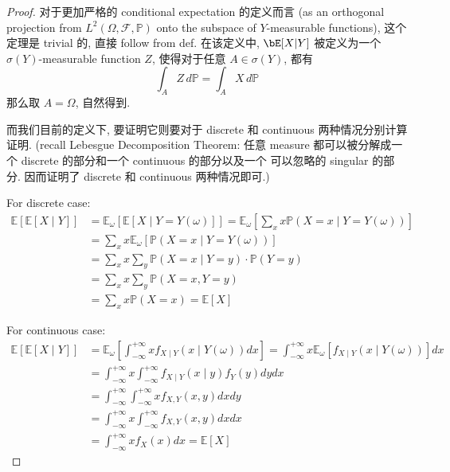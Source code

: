 \begin{proof}
对于更加严格的 conditional expectation 的定义而言
 (as an orthogonal projection from \(L^2(\Omega, \mathcal{F}, \mathbb{P})\) 
 onto the subspace of \(Y\)-measurable functions), 这个定理是 trivial 的, 直接 follow from def. 
在该定义中, \(\bE[X|Y]\) 被定义为一个 \(\sigma(Y)\)-measurable function \(Z\), 
使得对于任意 \(A \in \sigma(Y)\), 都有 \[
\int_A Z \, d\mathbb{P} = \int_A X \, d\mathbb{P}
\]
那么取 \(A = \Omega\), 自然得到.

而我们目前的定义下, 要证明它则要对于 discrete 和 continuous 两种情况分别计算证明.
(recall Lebesgue Decomposition Theorem: 
任意 measure 都可以被分解成一个 discrete 的部分和一个 continuous 的部分以及一个
可以忽略的 singular 的部分. 因而证明了 discrete 和 continuous 两种情况即可.)

For discrete case:
\begin{align*}
\mathbb{E}[\mathbb{E}[X \mid Y]] & =\mathbb{E}_\omega[\mathbb{E}[X \mid Y=Y(\omega)]]=\mathbb{E}_\omega\left[\sum_x x \mathbb{P}(X=x \mid Y=Y(\omega))\right] \\
& =\sum_x x \mathbb{E}_\omega[\mathbb{P}(X=x \mid Y=Y(\omega))] \\
& =\sum_x x \sum_y \mathbb{P}(X=x \mid Y=y) \cdot \mathbb{P}(Y=y) \\
& =\sum_x x \sum_y \mathbb{P}(X=x, Y=y) \\
& =\sum_x x \mathbb{P}(X=x)=\mathbb{E}[X]
\end{align*}

For continuous case:
\begin{align*}
\mathbb{E}[\mathbb{E}[X \mid Y]] & =\mathbb{E}_\omega\left[\int_{-\infty}^{+\infty} x f_{X \mid Y}(x \mid Y(\omega)) d x\right]=\int_{-\infty}^{+\infty} x \mathbb{E}_\omega\left[f_{X \mid Y}(x \mid Y(\omega))\right] d x \\
& =\int_{-\infty}^{+\infty} x \int_{-\infty}^{+\infty} f_{X \mid Y}(x \mid y) f_Y(y) d y d x \\
& =\int_{-\infty}^{+\infty} \int_{-\infty}^{+\infty} x f_{X, Y}(x, y) d x d y \\
& =\int_{-\infty}^{+\infty} x \int_{-\infty}^{+\infty} f_{X, Y}(x, y) d x d x \\
& =\int_{-\infty}^{+\infty} x f_X(x) d x=\mathbb{E}[X]
\end{align*}
\end{proof}



